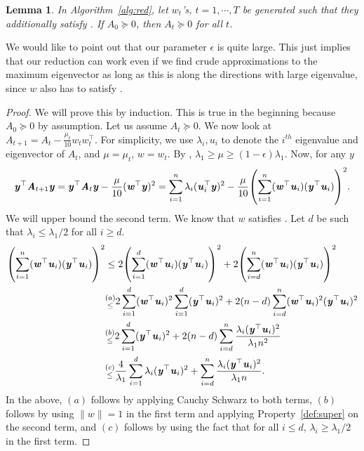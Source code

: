 \documentclass[11pt]{article}
\newtheorem{lemma}[theorem]{Lemma}
\let\originalleft\left
\let\originalright\right
\renewcommand{\left}{\mathopen{}\mathclose\bgroup\originalleft}
\renewcommand{\right}{\aftergroup\egroup\originalright}
\newcommand\uu{\boldsymbol{\mathit{u}}}
\newcommand\ww{\boldsymbol{\mathit{w}}}
\newcommand\yy{\boldsymbol{\mathit{y}}}
\renewcommand\AA{\boldsymbol{\mathit{A}}}
\begin{document}
\begin{lemma}\label{lem:orthoUpdate}
In Algorithm~\ref{alg:red}, let $\ww_t$'s, $t=1,\cdots, T$ be generated such that they additionally satisfy . If $\AA_0\succeq 0$, then $\AA_t \succeq 0$ for all $t$.
\end{lemma}
 We would like to point out that our parameter $\epsilon$ is quite large. This just implies that our reduction can work even if we find crude approximations to the maximum eigenvector as long as this is along the directions with large eigenvalue, since $\ww$ also has to satisfy .
\begin{proof}
We will prove this by induction. This is true in the beginning because $\AA_0 \succeq 0$ by assumption. Let us assume $\AA_{t}\succeq 0$. We now look at $\AA_{t+1} = \AA_{t}- \frac{\mu_{t}}{10} \ww_{t}\ww_{t}^{\top}$.
 For simplicity, we use $\lambda_i,\uu_i$ to denote the  $i^{th}$ eigenvalue and eigenvector of $\AA_{t}$, and $\mu = \mu_t$, $\ww = \ww_t$. By , $\lambda_1 \geq \mu \geq (1-\epsilon)\lambda_1$. Now, for any $\yy$
\begin{equation}\label{eq:psdT}
\yy^{\top}\AA_{t+1}\yy = \yy^{\top}\AA_{t}\yy - \frac{\mu}{10} (\ww^{\top}\yy)^2 = \sum_{i=1}^n \lambda_i (\uu_i^{\top}\yy)^2 -  \frac{\mu}{10}\left(\sum_{i=1}^n (\ww^{\top}\uu_i)(\yy^{\top}\uu_i)\right)^2 .
\end{equation}
We will upper bound the second term. We know that $\ww$ satisfies . Let $d$ be such that $\lambda_i \leq \lambda_1/2$ for all $i \geq d$.
\begin{align*}
\left(\sum_{i=1}^n (\ww^{\top}\uu_i)(\yy^{\top}\uu_i)\right)^2 & \leq 2 \left(\sum_{i=1}^d(\ww^{\top}\uu_i)(\yy^{\top}\uu_i)\right)^2 + 2 \left(\sum_{i=d}^n(\ww^{\top}\uu_i)(\yy^{\top}\uu_i)\right)^2\\
& \substack{(a)\\ \leq} 2 \sum_{i=1}^d (\ww^{\top}\uu_i)^2\sum_{i=1}^d (\yy^{\top}\uu_i)^2 + 2(n-d) \sum_{i=d}^n  (\ww^{\top}\uu_i)^2(\yy^{\top}\uu_i)^2\\
& \substack{(b)\\ \leq} 2 \sum_{i=1}^d (\yy^{\top}\uu_i)^2 + 2(n-d)\sum_{i=d}^n \frac{\lambda_i(\yy^{\top}\uu_i)^2}{\lambda_1 n^2}\\
& \substack{(c)\\ \leq}  \frac{4}{\lambda_1}\sum_{i=1}^d \lambda_i(\yy^{\top}\uu_i)^2 + \sum_{i=d}^n \frac{\lambda_i(\yy^{\top}\uu_i)^2}{\lambda_1 n}.
\end{align*}
In the above, $(a)$ follows by applying Cauchy Schwarz to both terms, $(b)$ follows by using $\|\ww\| = 1$ in the first term and applying Property~\ref{def:super} on the second term, and $(c)$ follows by using the fact that for all $i \leq d$, $\lambda_i \geq \lambda_1/2$ in the first term. 


\end{proof}
\end{document}
